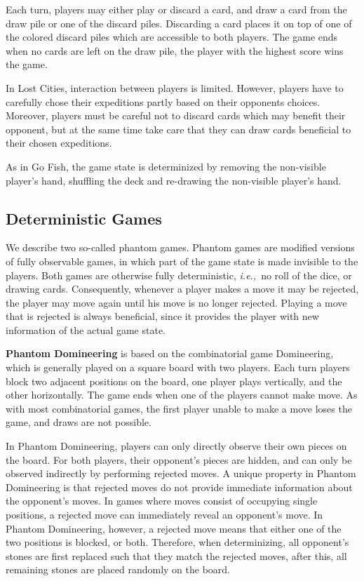 \documentclass[a4paper]{llncs}
\newcommand{\ie}{{\it i.e.,}~}
\begin{document}
Each turn, players may either play or discard a card, and draw a card from the draw pile or one of the discard piles. Discarding a card places it on top of one of the colored discard piles which are accessible to both players. The game ends when no cards are left on the draw pile, the player with the highest score wins the game.

In Lost Cities, interaction between players is limited. However, players have to carefully chose their expeditions partly based on their opponents choices. Moreover, players must be careful not to discard cards which may benefit their opponent, but at the same time take care that they can draw cards beneficial to their chosen expeditions. 

As in Go Fish, the game state is determinized by removing the non-visible player's hand, shuffling the deck and re-drawing the non-visible player's hand.

\subsection{Deterministic Games}

We describe two so-called phantom games. Phantom games are modified versions of fully observable games, in which part of the game state is made invisible to the players. Both games are otherwise fully deterministic, \ie no roll of the dice, or drawing cards. Consequently, whenever a player makes a move it may be rejected, the player may move again until his move is no longer rejected. Playing a move that is rejected is always beneficial, since it provides the player with new information of the actual game state.

{\sc \bf Phantom Domineering} is based on the combinatorial game Domineering, which is generally played on a square board with two players. Each turn players block two adjacent positions on the board, one player plays vertically, and the other horizontally. The game ends when one of the players cannot make move. As with most combinatorial games, the first player unable to make a move loses the game, and draws are not possible.

In Phantom Domineering, players can only directly observe their own pieces on the board. For both players, their opponent's pieces are hidden, and can only be observed indirectly by performing rejected moves. A unique property in Phantom Domineering is that rejected moves do not provide immediate information about the opponent's moves. In games where moves consist of occupying single positions, a rejected move can immediately reveal an opponent's move. In Phantom Domineering, however, a rejected move means that either one of the two positions is blocked, or both. Therefore, when determinizing, all opponent's stones are first replaced such that they match the rejected moves, after this, all remaining stones are placed randomly on the board.
\end{document}

